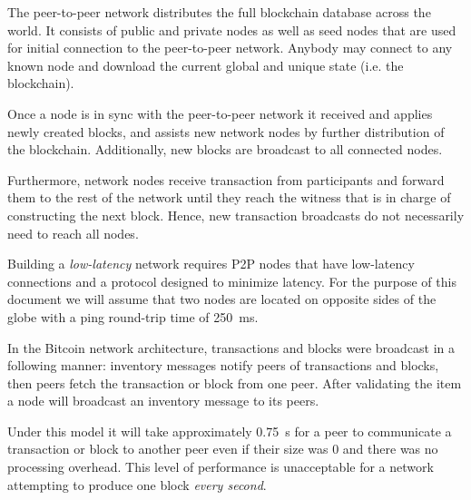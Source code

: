 The peer-to-peer network distributes the full blockchain database across the
world. It consists of public and private nodes as well as seed nodes that are
used for initial connection to the peer-to-peer network. Anybody may connect to
any known node and download the current global and unique state (i.e. the
blockchain).

Once a node is in sync with the peer-to-peer network it received and applies
newly created blocks, and assists new network nodes by further distribution of
the blockchain. Additionally, new blocks are broadcast to all connected nodes.

Furthermore, network nodes receive transaction from participants and forward
them to the rest of the network until they reach the witness that is in charge
of constructing the next block. Hence, new transaction broadcasts do not
necessarily need to reach all nodes.

% 

% 
Building a \emph{low-latency} network requires P2P nodes that have low-latency
connections and a protocol designed to minimize latency. For the purpose of
this document we will assume that two nodes are located on opposite sides of
the globe with a ping round-trip time of \SI{250}{ms}.

In the Bitcoin network architecture, transactions and blocks were broadcast in
a following manner: inventory messages notify peers of transactions and blocks,
then peers fetch the transaction or block from one peer. After validating the
item a node will broadcast an inventory message to its peers.

Under this model it will take approximately \SI{0.75}{s} for a peer to
communicate a transaction or block to another peer even if their size was 0 and
there was no processing overhead. This level of performance is unacceptable for
a network attempting to produce one block \emph{every second}.

